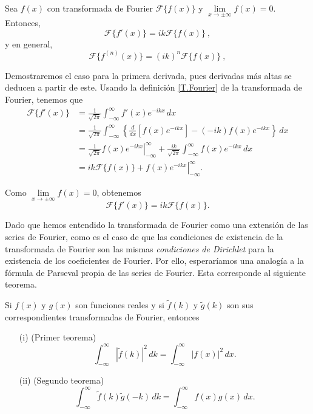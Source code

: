 \begin{propo}
Sea $f(x)$ con transformada de Fourier $\mathcal{F}\{f(x)\}$ y $\lim\limits_{x \to \pm \infty} f(x) = 0$. Entonces, 
\begin{equation}
    \boxed{\mathcal{F}\{f'(x)\} = i k \mathcal{F}\{f(x)\}\ ,} 
\end{equation}
y en general, 
\begin{equation}
    \mathcal{F}\{f^{(n)} (x)\} = (i k)^n \mathcal{F}\{f(x)\} \ ,
\end{equation}
\end{propo}

\begin{demo}
Demostraremos el caso para la primera derivada, pues derivadas más altas se deducen a partir de este. Usando la definición \eqref{T.Fourier} de la transformada de Fourier, tenemos que 
\begin{align*}
    \mathcal{F}\{f'(x)\} &= \frac{1}{\sqrt{2\pi}} \int_{- \infty}^{\infty} f'(x) e^{-ikx} \,dx \\
    &= \frac{1}{\sqrt{2\pi}} \int_{- \infty}^{\infty} \left\{ \frac{d}{dx}\left[ f(x) e^{-ikx} \right]  - (-ik) f(x) e^{-ikx} \right\}\,dx \\
    &= \frac{1}{\sqrt{2\pi}} \left. f(x) e^{-ikx} \right|_{-\infty}^{\infty} + \frac{ik}{\sqrt{2\pi}} \int_{- \infty}^{\infty}  f(x) e^{-ikx} \,dx \\
    &=  ik \mathcal{F}\{f(x)\} + \left. f(x) e^{-ikx} \right|_{-\infty}^{\infty}.
\end{align*}

Como  $\lim\limits_{x \to \pm \infty} f(x) = 0$, obtenemos
$$\mathcal{F}\{f'(x)\} = i k \mathcal{F}\{f(x)\}.$$
\end{demo}



Dado que hemos entendido la transformada de Fourier como una extensión de las series de Fourier, como es el caso de que las condiciones de existencia de la transformada de Fourier son las mismas \emph{condiciones de Dirichlet} para la existencia de los coeficientes de Fourier. Por ello, esperaríamos una analogía a la fórmula de Parseval propia de las series de Fourier. Esta corresponde al siguiente teorema.

\begin{teorema}[de Parseval]
Si $f(x)$ y $g(x)$ son funciones reales y si $\tilde{f}(k)$ y $\tilde{g}(k)$ son sus correspondientes transformadas de Fourier, entonces

\begin{itemize}
    \item[(i)] (Primer teorema)
    $$\int_{-\infty}^{\infty} |\tilde{f}(k)|^2\, dk = \int_{-\infty}^{\infty} |f(x)|^2 \, dx. $$
    
    \item[(ii)] (Segundo teorema)
    $$\int_{-\infty}^{\infty} \tilde{f}(k) \tilde{g}(-k) \, dk = \int_{-\infty}^{\infty} f(x) g(x) \, dx. $$
    
\end{itemize}
\end{teorema}

